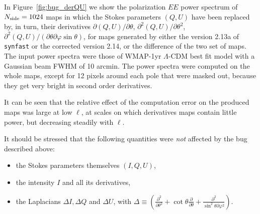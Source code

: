 In Figure~\ref{fig:bug_derQU} we show the polarization $EE$ power spectrum of
$N_{\rm side} = 1024$ maps
in which the Stokes parameters $(Q,U)$ have been replaced by, in turn, their derivatives
$\partial (Q,U)/\partial\theta$, 
$\partial^2 (Q,U)/\partial \theta^2$, 
$\partial^2 (Q,U)/(\partial\theta\partial\varphi\sin\theta)$, 
for maps generated
by either the version 2.13a of {\tt synfast} or the corrected version 2.14, or
the difference of the two set of maps.
The input power spectra were those of WMAP-1yr $\Lambda$-CDM best fit model with a Gaussian
beam FWHM of 10 arcmin. The power spectra were computed on the whole maps, except
for 12 pixels around each pole that were masked out, because they get very
bright in second order derivatives.

It can be seen that the relative effect of the computation error on the produced maps was
large at low $\ell$, at scales on which derivatives maps contain little power, but decreasing
steadily with $\ell$.


\vskip 1cm
It should be stressed that the following quantities were {\em not} affected by
the bug described above:
\begin{itemize}
\item the Stokes parameters themselves $(I,Q,U)$,
\item the intensity $I$ and all its derivatives,
\item the Laplacians $\Delta I, \Delta Q$ and $\Delta U$, with
$\Delta \equiv \left(
\frac{\partial^2}{\partial\theta^2}
+ \cot\theta\frac{\partial}{\partial\theta} + 
\frac{\partial^2}{\sin^2\theta\partial\varphi^2} 
\right)$.
\end{itemize}

